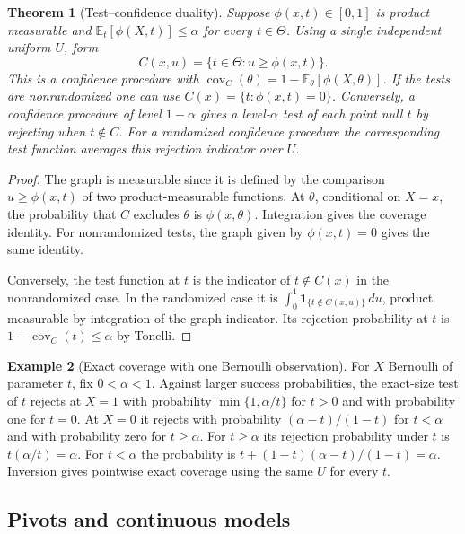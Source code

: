 \documentclass[11pt,oneside]{book}
\newtheorem{theorem}{Theorem}[chapter]
\theoremstyle{definition}
\newtheorem{example}[theorem]{Example}
\theoremstyle{remark}
\begin{document}
\begin{theorem}[Test--confidence duality]
\label{thm:test-confidence-duality}
Suppose $\phi(x,t)\in[0,1]$ is product measurable and
$\mathbb E_t[\phi(X,t)]\leq\alpha$ for every $t\in\Theta$.
Using a single independent uniform $U$, form
\[
C(x,u)=\{t\in\Theta:u\geq\phi(x,t)\}.
\]
This is a confidence procedure with
$\operatorname{cov}_C(\theta)=1-\mathbb E_\theta[\phi(X,\theta)]$.
If the tests are nonrandomized one can use
$C(x)=\{t:\phi(x,t)=0\}$. Conversely, a confidence procedure of
level $1-\alpha$ gives a level-$\alpha$ test of each point
null $t$ by rejecting when $t\notin C$. For a randomized
confidence procedure the corresponding test function averages
this rejection indicator over $U$.
\end{theorem}
\begin{proof}
The graph is measurable since it is defined by the comparison
$u\geq\phi(x,t)$ of two product-measurable functions.
At $\theta$, conditional on $X=x$, the probability that $C$
excludes $\theta$ is $\phi(x,\theta)$. Integration gives the
coverage identity. For nonrandomized tests, the graph given by
$\phi(x,t)=0$ gives the same identity.

Conversely, the test function at $t$ is the indicator of
$t\notin C(x)$ in the nonrandomized case. In the randomized case it is
$\int_0^1\mathbf 1_{\{t\notin C(x,u)\}}\,du$, product measurable by
integration of the graph indicator. Its rejection probability
at $t$ is $1-\operatorname{cov}_C(t)\leq\alpha$ by Tonelli.
\end{proof}

\begin{example}[Exact coverage with one Bernoulli observation]
\label{ex:confidence-bernoulli-shared-randomizer}
For $X$ Bernoulli of parameter $t$, fix $0<\alpha<1$.
Against larger success probabilities, the exact-size test
of $t$ rejects at $X=1$ with probability $\min\{1,\alpha/t\}$
for $t>0$ and with probability one for $t=0$. At $X=0$ it
rejects with probability $(\alpha-t)/(1-t)$ for $t<\alpha$
and with probability zero for $t\geq\alpha$.
For $t\geq\alpha$ its rejection probability under $t$ is
$t(\alpha/t)=\alpha$. For $t<\alpha$ the probability is
$t+(1-t)(\alpha-t)/(1-t)=\alpha$. Inversion gives pointwise
exact coverage using the same $U$ for every $t$.
\end{example}

\subsection{Pivots and continuous models}
\label{subsec:confidence-pivots}
\end{document}
